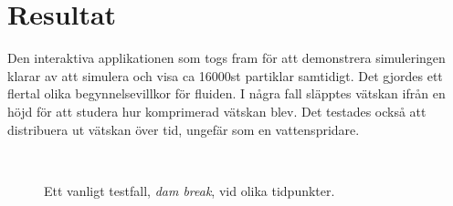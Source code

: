 \documentclass[a4paper,12pt,oneside,final]{extarticle}
\begin{document}
\section{Resultat}
Den interaktiva applikationen som togs fram för att demonstrera simuleringen klarar av att simulera och visa ca 16000st partiklar samtidigt.
Det gjordes ett flertal olika begynnelsevillkor för fluiden.
I några fall släpptes vätskan ifrån en höjd för att studera hur komprimerad vätskan blev.
Det testades också att distribuera ut vätskan över tid, ungefär som en vattenspridare.

\begin{figure}[H]
\centering
  \begin{subfigure}[b]{.4\textwidth}
      \setlength\fboxsep{0pt}
      \setlength\fboxrule{0.5pt}
  \end{subfigure}
  ~
  \begin{subfigure}[b]{.4\textwidth}
      \setlength\fboxsep{0pt}
      \setlength\fboxrule{0.5pt}
  \end{subfigure}
\caption{Ett vanligt testfall, \textit{dam break}, vid olika tidpunkter.}
\end{figure}
\end{document}
